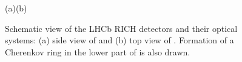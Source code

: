 \begin{figure}[h!]
  \vspace{-0.5\baselineskip}
  \hspace{0.51\textwidth}(a)\hspace{0.47\textwidth}(b)\hspace{0.02\textwidth}
  \vspace{-0.5\baselineskip}
  \caption{
    Schematic view of the LHCb RICH detectors and their optical systems:
    (a) side view of \richone and (b) top view of \richtwo. Formation of a
    Cherenkov ring in the lower part of \richone is also drawn.}
  \label{fig:RICH_OpticalLayout}
  \vspace{-0.5\baselineskip}
\end{figure}


